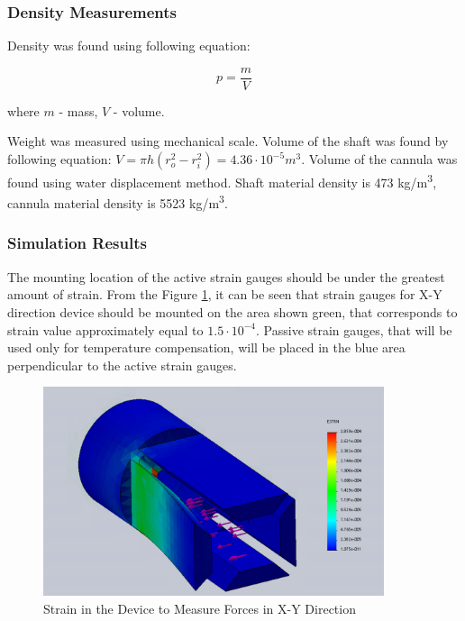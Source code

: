 	\subsubsection{Density Measurements}
	\label{sec:DenMeas}
Density was found using following equation:

\begin{equation}
p=\frac{m}{V}
\end{equation}

where $m$ - mass, $V$ - volume.

Weight was measured using mechanical scale. Volume of the shaft was found by following equation: $V =  \pi h(r_o^2-r_i^2) = 4.36 \cdot 10^{-5} m^3$. Volume of the cannula was found using water displacement method. Shaft material density is 473 kg/m\textsuperscript{3}, cannula material density is 5523 kg/m\textsuperscript{3}.

\subsubsection{Simulation Results}
\label{sec:FEAres}
The mounting location of the active strain gauges should be under the greatest amount of strain. From the Figure \ref{fig:XYdev}, it can be seen that strain gauges for X-Y direction device should be mounted on the area shown green, that corresponds to strain value approximately equal to $1.5 \cdot 10^{-4}$. Passive strain gauges, that will be used only for temperature compensation, will be placed in the blue area perpendicular to the active strain gauges.

\begin{figure}[h]
	\begin{center}
		\includegraphics[width=100mm]{fig/methods/old_sleeve.png}
	\end{center}
	\vspace{-4mm}
	\caption[Strain in the Device to Measure Forces in X-Y Direction]
	{Strain in the Device to Measure Forces in X-Y Direction}
	\label{fig:XYdev}
	\vspace{-2mm}
\end{figure}


